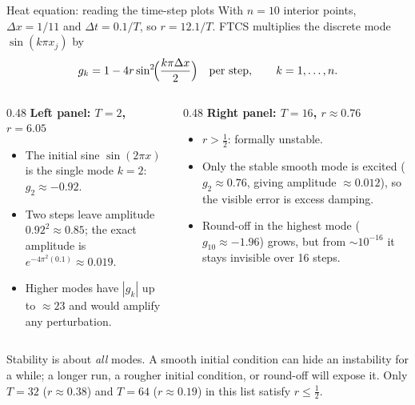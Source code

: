 \documentclass[aspectratio=169,11pt]{beamer}
\begin{document}
\begin{frame}{Heat equation: reading the time-step plots}
\footnotesize
\setlength{\abovedisplayskip}{4pt}\setlength{\belowdisplayskip}{4pt}%
With \(n=10\) interior points, \(\Delta x=1/11\) and \(\Delta t=0.1/T\), so \(r=12.1/T\). FTCS multiplies the discrete mode \(\sin(k\pi x_j)\) by
\[
  g_k=1-4r\sin^2\!\Bigl(\frac{k\pi\Delta x}{2}\Bigr)\quad\text{per step},\qquad k=1,\dots,n .
\]
\begin{columns}[T,onlytextwidth]
\begin{column}{0.48\textwidth}
\textbf{Left panel: \(T=2\), \(r=6.05\)}
\begin{itemize}\itemsep3pt
  \item The initial sine \(\sin(2\pi x)\) is the single mode \(k=2\): \(g_2\approx-0.92\).
  \item Two steps leave amplitude \(0.92^2\approx0.85\); the exact amplitude is \(e^{-4\pi^2(0.1)}\approx0.019\).
  \item Higher modes have \(|g_k|\) up to \(\approx23\) and would amplify any perturbation.
\end{itemize}
\end{column}
\begin{column}{0.48\textwidth}
\textbf{Right panel: \(T=16\), \(r\approx0.76\)}
\begin{itemize}\itemsep3pt
  \item \(r>\tfrac12\): formally unstable.
  \item Only the stable smooth mode is excited (\(g_2\approx0.76\), giving amplitude \(\approx0.012\)), so the visible error is excess damping.
  \item Round-off in the highest mode (\(g_{10}\approx-1.96\)) grows, but from \(\sim10^{-16}\) it stays invisible over 16 steps.
\end{itemize}
\end{column}
\end{columns}
\begin{punchbox}
\small Stability is about \emph{all} modes. A smooth initial condition can hide an instability for a while; a longer run, a rougher initial condition, or round-off will expose it. Only \(T=32\) (\(r\approx0.38\)) and \(T=64\) (\(r\approx0.19\)) in this list satisfy \(r\le\tfrac12\).
\end{punchbox}
\end{frame}
\end{document}
